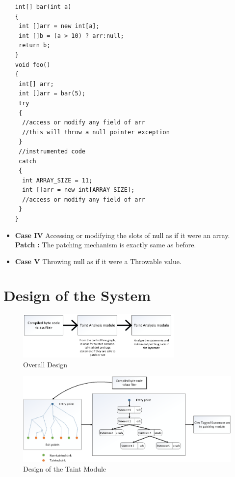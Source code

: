 \documentclass{sigplanconf}
\begin{document}
\begin{itemize}
  \lstset{language=Java, caption=array null pointer exception,
  label=patchingexample2}

\begin{lstlisting}
int[] bar(int a)
{
 int []arr = new int[a];
 int []b = (a > 10) ? arr:null;
 return b; 
}
void foo()
{
 int[] arr;
 int []arr = bar(5);
 try
 {
  //access or modify any field of arr
  //this will throw a null pointer exception
 }
 //instrumented code
 catch
 {
  int ARRAY_SIZE = 11;
  int []arr = new int[ARRAY_SIZE];
  //access or modify any field of arr
 }
}
\end{lstlisting}
  \item \textbf{Case IV} Accessing or modifying the slots of null as if it were
  an array.
 \textbf{Patch :} The patching mechanism is exactly same as before.
 
  \item \textbf{Case V} Throwing null as if it were a Throwable value.
\end{itemize}


\section{Design of the System}
\label{sec:SystemDesign}


\begin{figure}[!htb]
\centering
\includegraphics[width=3.2in]{images/OverallDesign.png}
\caption{Overall Design}
\label{fig:overallDesign}
\end{figure}


% 

\begin{figure}
\centering
  \includegraphics[width= 7.0in]{images/TaintModule.png}
  \caption{Design of the Taint Module}
  \label{fig:TaintModule}
\end{figure}
\end{document}
